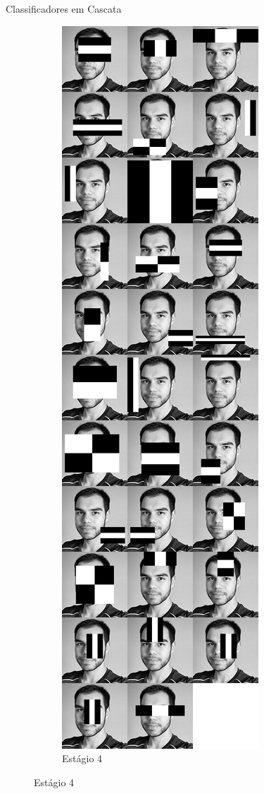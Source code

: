 \begin{frame}{Classificadores em Cascata}
\begin{figure}[htbp]
\begin{subfigure}[t]{0.24\textwidth}
    \end{subfigure}
    \begin{subfigure}[t]{0.24\textwidth}
    \centering
    \caption{Estágio 4}
    \includegraphics[height=0.6\textheight,width=\textwidth,keepaspectratio]{imagens/cascata_estagio_04.png}
    \end{subfigure}
\end{figure}
\end{frame}

